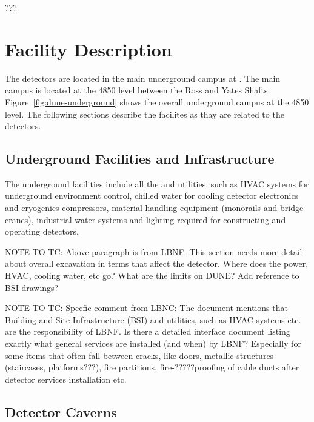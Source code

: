 ???\chapter{Facility Description}
\label{vl:tc-facility}

The  detectors are located in the main underground campus at . The main campus is located at the 4850 level between the Ross and Yates Shafts. Figure~\ref{fig:dune-underground} shows the overall underground campus at the  4850 level. The following sections describe the facilites as thay are related to the  detectors.

\section{Underground Facilities and Infrastructure}
\label{sec:fdsp-coord-uderground-excavation}

The underground facilities include all the  and utilities,
such as HVAC systems for underground environment control, chilled
water for cooling detector electronics and cryogenics compressors,
material handling equipment (monorails and bridge cranes), industrial
water systems and lighting required for constructing and operating
detectors.

NOTE TO TC:  Above paragraph is from LBNF. This section needs more detail about overall excavation in terms that affect the detector. Where
does the power, HVAC, cooling water, etc go? What are the limits on DUNE? Add reference to BSI drawings?

NOTE TO TC: Specfic comment from LBNC:
The document mentions that Building and Site Infrastructure (BSI) and utilities, such as HVAC systems etc. are the responsibility of LBNF. Is there a 
detailed interface document listing exactly what general services are installed (and when) by LBNF? Especially for some items that often fall between cracks, like doors, metallic structures (staircases, platforms???), fire partitions, fire-?????proofing of cable ducts after detector services installation etc. 



\section{Detector Caverns}
\label{sec:fdsp-coord-faci-caverns}



